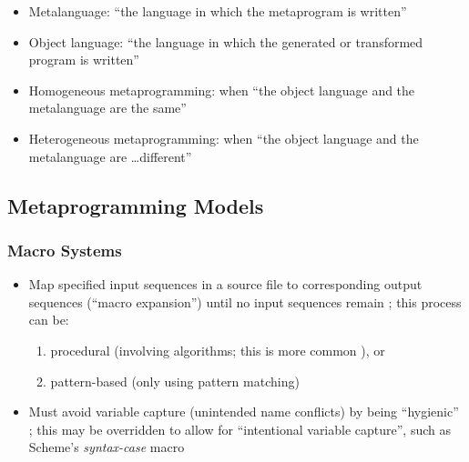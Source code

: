 \begin{itemize}
      \item Metalanguage: ``the language in which the metaprogram is written''
            \citep[p.~113:1]{lilis_survey_2019}
      \item Object language: ``the language in which the generated or
            transformed program is written'' \citep[p.~113:1]{lilis_survey_2019}
      \item Homogeneous metaprogramming: when ``the object language and the
            metalanguage are the same'' \citep[p.~113:1]{lilis_survey_2019}
      \item Heterogeneous metaprogramming: when ``the object language and the
            metalanguage are \dots different'' \citep[p.~113:1]{lilis_survey_2019}
\end{itemize}

\subsection{Metaprogramming Models}
\subsubsection{Macro Systems \citep[p.~113:3-7]{lilis_survey_2019}}
\begin{itemize}
      \item Map specified input sequences in a source file to corresponding
            output sequences (``macro expansion'') until no input sequences
            remain \citep[p.~113:3]{lilis_survey_2019}; this process can be:
            \begin{enumerate}
                  \item procedural (involving algorithms; this is more common
                        \citep[p.~113:31]{lilis_survey_2019}), or
                  \item pattern-based (only using pattern matching)
                        \citep[p.~113:4]{lilis_survey_2019}
            \end{enumerate}
      \item Must avoid variable capture (unintended name conflicts) by being
            ``hygienic'' \citep[p.~113:4]{lilis_survey_2019}; this may be
            overridden to allow for ``intentional variable capture'', such as
            Scheme's \emph{syntax-case} macro \citep[p.~113:5]{lilis_survey_2019}
\end{itemize}

